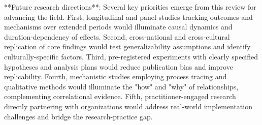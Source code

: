 \documentclass[11pt, a4paper]{article}
\begin{document}
**Future research directions**: Several key priorities emerge from this review for advancing the field. First, longitudinal and panel studies tracking outcomes and mechanisms over extended periods would illuminate causal dynamics and duration-dependency of effects. Second, cross-national and cross-cultural replication of core findings would test generalizability assumptions and identify culturally-specific factors. Third, pre-registered experiments with clearly specified hypotheses and analysis plans would reduce publication bias and improve replicability. Fourth, mechanistic studies employing process tracing and qualitative methods would illuminate the "how" and "why" of relationships, complementing correlational evidence. Fifth, practitioner-engaged research directly partnering with organizations would address real-world implementation challenges and bridge the research-practice gap.



\end{document}
